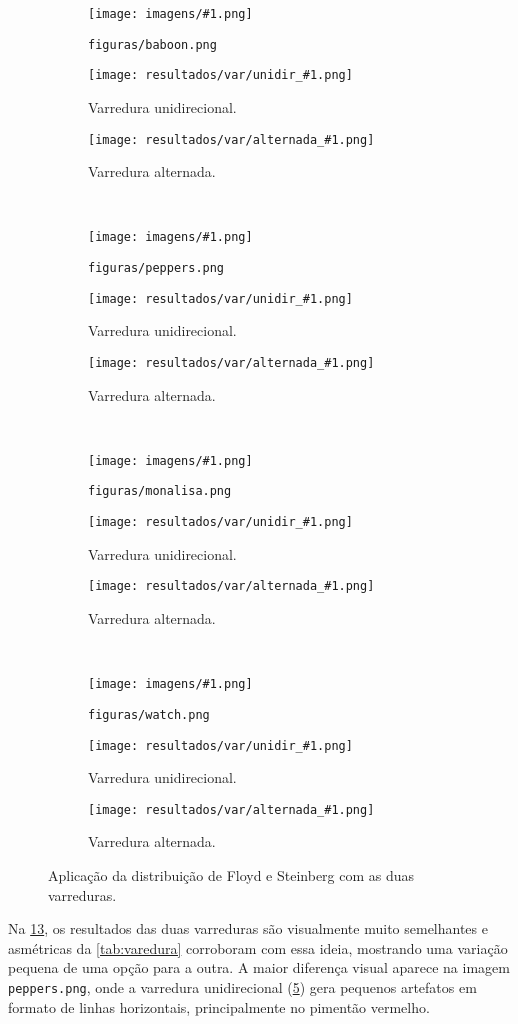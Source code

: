 \newcommand{\imagem}[1]{
    \centering
    \begin{subfigure}{0.32\textwidth}
        \centering
        \texttt{[image: imagens/\#1.png]}
        \caption{\texttt{figuras/#1.png}}
        \label{fig:#1:orig}
    \end{subfigure}%
    \begin{subfigure}{0.32\textwidth}
        \centering
        \texttt{[image: resultados/var/unidir\_\#1.png]}
        \caption{Varredura unidirecional.}
        \label{fig:#1:unidir}
    \end{subfigure}%
    \begin{subfigure}{0.32\textwidth}
        \centering
        \texttt{[image: resultados/var/alternada\_\#1.png]}
        \caption{Varredura alternada.}
        \label{fig:#1:floyd}
    \end{subfigure}
}

\begin{figure}[H]
    \centering
    \imagem{baboon}\\[8pt]
    \imagem{peppers}\\[8pt]
    \imagem{monalisa}\\[8pt]
    \imagem{watch}

    \caption{Aplicação da distribuição de Floyd e Steinberg com as duas varreduras.}
    \label{fig:resultado:varredura}
\end{figure}

Na \cref{fig:resultado:varredura}, os resultados das duas varreduras são visualmente muito semelhantes e asmétricas da \cref{tab:varedura} corroboram com essa ideia, mostrando uma variação pequena de uma opção para a outra. A maior diferença visual aparece na imagem \texttt{peppers.png}, onde a varredura unidirecional (\ref{fig:peppers:unidir}) gera pequenos artefatos em formato de linhas horizontais, principalmente no pimentão vermelho.

